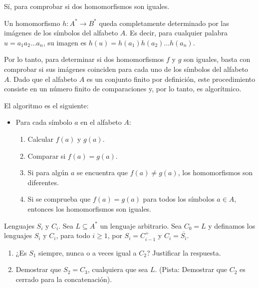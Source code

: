 \documentclass[12pt]{book} %
\begin{document}
\begin{solucion}

Sí,  para comprobar si dos homomorfismos son iguales.

Un homomorfismo \( h: A^* \to B^* \) queda completamente determinado por las imágenes de los símbolos del alfabeto \( A \). Es decir, para cualquier palabra \( u = a_1a_2\ldots a_n \), su imagen es \( h(u) = h(a_1)h(a_2)\ldots h(a_n) \).

Por lo tanto, para determinar si dos homomorfismos \( f \) y \( g \) son iguales, basta con comprobar si sus imágenes coinciden para cada uno de los símbolos del alfabeto \( A \). Dado que el alfabeto \( A \) es un conjunto finito por definición, este procedimiento consiste en un número finito de comparaciones y, por lo tanto, es algorítmico.

El algoritmo es el siguiente:
\begin{itemize}
    \item Para cada símbolo \( a \) en el alfabeto \( A \):
    \begin{enumerate}
        \item Calcular \( f(a) \) y \( g(a) \).
        \item Comparar si \( f(a) = g(a) \).
        \item Si para algún \( a \) se encuentra que \( f(a) \neq g(a) \), los homomorfismos son diferentes.
        \item Si se comprueba que \( f(a) = g(a) \) para todos los símbolos \( a \in A \), entonces los homomorfismos son iguales.
    \end{enumerate}
\end{itemize}

\end{solucion}

\begin{ejercicio}
Lenguajes $S_i$ y $C_i$. 
Sea $L \subseteq A^*$ un lenguaje arbitrario. Sea $C_0 = L$ y definamos los lenguajes $S_i$ y $C_i$, para todo $i \geq 1$, por $S_i = C_{i-1}^+$ y $C_i = \overline{S_i}$. 

\begin{enumerate}[label=\alph*)]
    \item ¿Es $S_1$ siempre, nunca o a veces igual a $C_2$? Justificar la respuesta.  

    \item Demostrar que $S_2 = C_3$, cualquiera que sea $L$. (Pista: Demostrar que $C_2$ es cerrado para la concatenación).
\end{enumerate}

\end{ejercicio}
\end{document}
